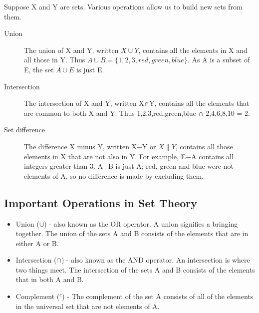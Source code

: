Suppose X and Y are sets. Various operations allow us to build new sets from them.

\begin{description}
\item[Union]
The union of X and Y, written $X\cup Y$, contains all the elements in X and all those in Y. Thus $A \cup B = \{1, 2, 3, red, green, blue\}$. As A is a subset of E, the set $A \cup E$ is just E.

\item[Intersection]

The intersection of X and Y, written X∩Y, contains all the elements that are common to both X and Y. Thus {1,2,3,red,green,blue} ∩ {2,4,6,8,10} = {2}.

\item[Set difference]

The difference X minus Y, written X−Y or $X\|Y$, contains all those elements in X that are not also in Y. For example, E−A contains all integers greater than 3. A−B is just A; red, green and blue were not elements of A, so no difference is made by excluding them.
\end{description}



\subsection{Important Operations in Set Theory}

\begin{itemize}
\item Union ($\cup$) - also known as the OR operator. A union signifies a bringing together. The union of the sets A and B consists of the elements that are in either A or B.
\item Intersection ($\cap$) - also known as the AND operator. An intersection is where two things meet. The intersection of the sets A and B consists of the elements that in both A and B.
\item Complement ($^{c}$) - The complement of the set A consists of all of the elements in the universal set that are not elements of A.
\end{itemize}



